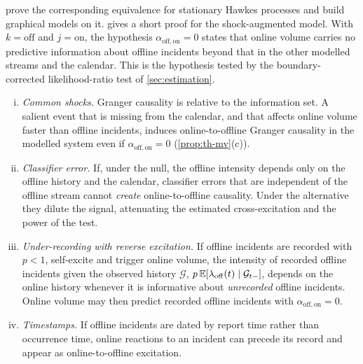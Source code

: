  prove the corresponding equivalence for stationary Hawkes processes
and build graphical models on it.  gives a short proof for the
shock-augmented model. With $k=\mathrm{off}$ and $j=\mathrm{on}$, the hypothesis
$\alpha_{\mathrm{off},\mathrm{on}}=0$ states that online volume carries no predictive
information about offline incidents beyond that in the other modelled streams and the
calendar. This is the hypothesis tested by the boundary-corrected likelihood-ratio test
of \cref{sec:estimation}.

\begin{remark}\label{rem:th-granger-caveats}
\begin{enumerate}[(i)]
  \item \emph{Common shocks.} Granger causality is relative to the information set.
  A salient event that is missing from the calendar, and that affects online volume
  faster than offline incidents, induces online-to-offline Granger causality in the
  modelled system even if $\alpha_{\mathrm{off},\mathrm{on}}=0$
  (\cref{prop:th-mv}(c)).
  \item \emph{Classifier error.} If, under the null, the offline intensity depends only
  on the offline history and the calendar, classifier errors that are independent of the
  offline stream cannot \emph{create} online-to-offline causality. Under the alternative
  they dilute the signal, attenuating the estimated cross-excitation and the power of
  the test.
  \item \emph{Under-recording with reverse excitation.} If offline incidents are
  recorded with $p<1$, self-excite and trigger online volume, the intensity of recorded
  offline incidents given the observed history $\mathcal G$,
  $p\,\mathbb{E}[\lambda_{\mathrm{off}}(t)\mid\mathcal G_{t-}]$, depends on the online history
  whenever it is informative about \emph{unrecorded} offline incidents. Online volume may
  then predict recorded offline incidents with $\alpha_{\mathrm{off},\mathrm{on}}=0$.
  \item \emph{Timestamps.} If offline incidents are dated by report time rather than
  occurrence time, online reactions to an incident can precede its record and appear
  as online-to-offline excitation.
\end{enumerate}
\end{remark}
